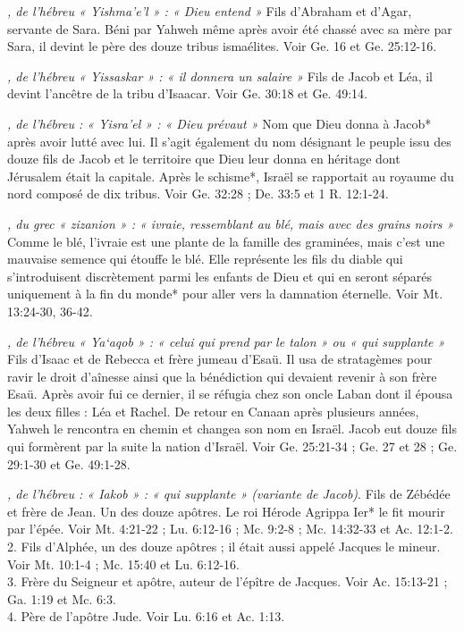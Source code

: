 \begin{multicols}{2}
\textit{, de l'hébreu « Yishma'e'l » : « Dieu entend »}\newline
Fils d'Abraham et d'Agar, servante de Sara. Béni par Yahweh même après avoir été chassé avec sa mère par Sara, il devint le père des douze tribus ismaélites. Voir Ge. 16 et Ge. 25:12-16.

\textit{, de l'hébreu « Yissaskar » : « il donnera un salaire »}\newline
Fils de Jacob et Léa, il devint l'ancêtre de la tribu d'Isaacar. Voir Ge. 30:18 et Ge. 49:14.

\textit{, de l'hébreu : « Yisra'el » : « Dieu prévaut »}\newline
Nom que Dieu donna à Jacob* après avoir lutté avec lui. Il s'agit également du nom désignant le peuple issu des douze fils de Jacob et le territoire que Dieu leur donna en héritage dont Jérusalem était la capitale. Après le schisme*, Israël se rapportait au royaume du nord composé de dix tribus. Voir Ge. 32:28 ; De. 33:5 et 1 R. 12:1-24.

\textit{, du grec « zizanion » : « ivraie, ressemblant au blé, mais avec des grains noirs »}\newline
Comme le blé, l'ivraie est une plante de la famille des graminées, mais c'est une mauvaise semence qui étouffe le blé. Elle représente les fils du diable qui s'introduisent discrètement parmi les enfants de Dieu et qui en seront séparés uniquement à la fin du monde* pour aller vers la damnation éternelle. Voir Mt. 13:24-30, 36-42.

\textit{, de l'hébreu « Ya`aqob » : « celui qui prend par le talon » ou « qui supplante »}\newline
Fils d'Isaac et de Rebecca et frère jumeau d'Esaü. Il usa de stratagèmes pour ravir le droit d'aînesse ainsi que la bénédiction qui devaient revenir à son frère Esaü. Après avoir fui ce dernier, il se réfugia chez son oncle Laban dont il épousa les deux filles : Léa et Rachel. De retour en Canaan après plusieurs années, Yahweh le rencontra en chemin et changea son nom en Israël. Jacob eut douze fils qui formèrent par la suite la nation d'Israël. Voir Ge. 25:21-34 ; Ge. 27 et 28 ; Ge. 29:1-30 et Ge. 49:1-28.

\textit{, de l'hébreu : « Iakob » : « qui supplante » (variante de Jacob)}. Fils de Zébédée et frère de Jean. Un des douze apôtres. Le roi Hérode Agrippa Ier* le fit mourir par l'épée. Voir Mt. 4:21-22 ; Lu. 6:12-16 ; Mc. 9:2-8 ; Mc. 14:32-33 et Ac. 12:1-2.
\\2. Fils d'Alphée, un des douze apôtres ; il était aussi appelé Jacques le mineur. Voir Mt. 10:1-4 ; Mc. 15:40 et Lu. 6:12-16.
\\3. Frère du Seigneur et apôtre, auteur de l'épître de Jacques. Voir Ac. 15:13-21 ; Ga. 1:19 et Mc. 6:3.
\\4. Père de l'apôtre Jude. Voir Lu. 6:16 et Ac. 1:13.


\end{multicols}
